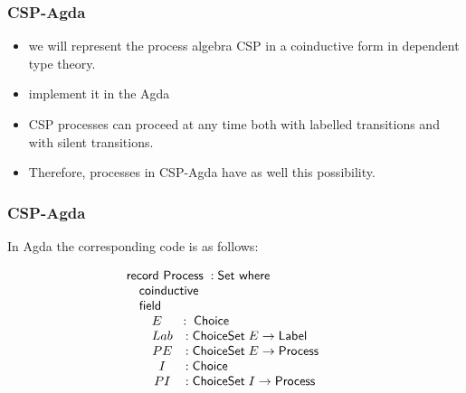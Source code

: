 \documentclass{beamer}
\newcommand{\ar}{\rightarrow}
\newcommand{\wheresf}{\mathsf{where}}
\newcommand{\Set}{\mathsf{Set}}
\newcommand{\record}{\mathsf{record}}
\newcommand{\coinductive}{\mathsf{coinductive}}
\newcommand{\field}{\mathsf{field}}
\newcommand{\Process}{\mathsf{Process}}
\newcommand{\Choice}{\mathsf{Choice}}
\newcommand{\ChoiceSet}{\mathsf{ChoiceSet}}
\newcommand{\Label}{\mathsf{Label}}
\begin{document}







\begin{frame}
\frametitle{CSP-Agda}

\begin{itemize}

\item we will represent the process algebra CSP in a coinductive form in dependent type theory.

\item implement it in the Agda

\item CSP processes can proceed at any time both
with labelled transitions and with silent transitions.

\item Therefore, processes in CSP-Agda
have as well this possibility.


\end{itemize}
\end{frame}




\begin{frame}
\frametitle{CSP-Agda}

In Agda the corresponding code is as follows: %

\[\begin{array}[t]{@{}l} 
\record\ \Process\;: \Set\ \wheresf  \\
\mbox{\quad}
\begin{array}[t]{@{}lcl} 
\coinductive \\
\field \\
\mbox{\quad} \begin{array}[t]{@{}l} E \; \; \;\; \; : \; \Choice\\
\begin{array}[t]{@{}cl@{}lcl} 
 Lab  &:& \; \ChoiceSet \;E \ar \Label\\
 PE   &:& \; \ChoiceSet\;E \ar \Process\\
 I    &:&\;  \Choice\\
 PI   &:& \; \ChoiceSet \;I  \ar \Process\\

\end{array} 
\end{array} 
\end{array} 
\end{array} \]


\end{frame}
\end{document}
